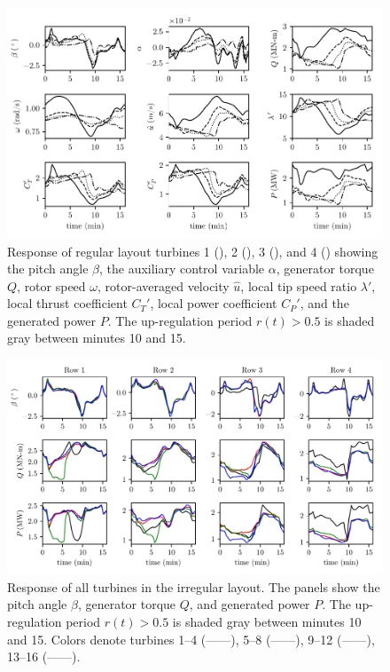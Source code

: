 \begin{figure}[h]
\centering
\includegraphics[width=\textwidth]{./fig/mpc.pdf}
\caption{Response of regular layout turbines 1 (\full), 2 (\broken), 3 (\dashed), and 4 (\dashdot) showing the pitch angle $\beta$, the auxiliary control variable $\alpha$, generator torque $Q$, rotor speed $\omega$, rotor-averaged velocity $\hat{u}$, local tip speed ratio $\lambda'$, local thrust coefficient $C_T'$, local power coefficient $C_P'$, and the generated power $P$. The up-regulation period $r(t) > 0.5$ is shaded gray between minutes 10 and 15.}
\label{fig:mpc}
\end{figure}

\begin{figure}[h]
\centering
\includegraphics[width=\textwidth]{./fig/mpc2.pdf}
\caption{Response of all turbines in the irregular layout. The panels show the pitch angle $\beta$, generator torque $Q$, and generated power $P$. The up-regulation period $r(t) > 0.5$ is shaded gray between minutes 10 and 15. Colors denote turbines 1--4 (------), 5--8 ({\color{red}------}), 9--12 ({\color{blue}------}), 13--16 ({\color{forest_green}------}).}
\label{fig:mpc2}
\end{figure}


